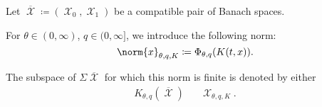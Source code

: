 \begin{definition}\label{def:k_functional_interpolation_space}\mcite\cite[40]{Bergh1976}
  Let \( \overline{\mscrX} \coloneqq ( \mscrX_0, \mscrX_1 ) \) be a compatible pair of Banach spaces.

  For \( \theta \in (0, \infty) \), \( q \in (0, \infty] \), we introduce the following norm:
  \begin{equation}\label{eq:def:k_functional_interpolation_space/norm}
    \norm{x}_{\theta,q,K} \coloneqq \Phi_{\theta,q}(K(t, x)).
  \end{equation}

  The subspace of \( \Sigma\overline{\mscrX} \) for which this norm is finite is denoted by either
  \begin{align*}
    K_{\theta,q}(\overline{\mscrX})
    &&
    \mscrX_{\theta,q,K}.
  \end{align*}
\end{definition}

